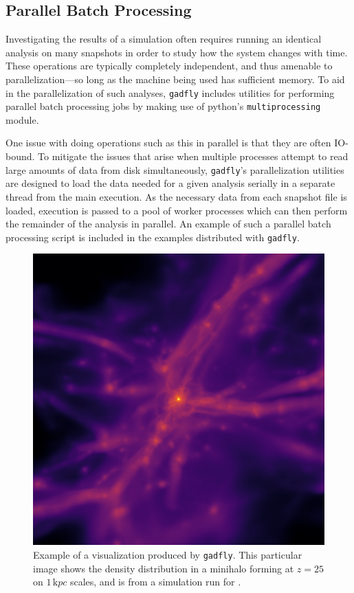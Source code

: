 \documentclass{thesis}
\newcommand{\code}[1]{\texttt{#1}}
\begin{document}
\subsection{Parallel Batch Processing}
\label{sec:parallel}
Investigating the results of a simulation often requires running an identical analysis on many snapshots in order to study how the system changes with time.  
These operations are typically completely independent, and thus amenable to parallelization---so long as the machine being used has sufficient memory.
To aid in the parallelization of such analyses, \code{gadfly} includes utilities for performing parallel batch processing jobs by making use of python's \code{multiprocessing} module. 

One issue with doing operations such as this in parallel is that they are often IO-bound.
To mitigate the issues that arise when multiple processes attempt to read large amounts of data from disk simultaneously, \code{gadfly}'s parallelization utilities are designed to load the data needed for a given analysis serially in a separate thread from the main execution. 
As the necessary data from each snapshot file is loaded, execution is passed to a pool of worker processes which can then perform the remainder of the analysis in parallel.  An example of such a parallel batch processing script is included in the examples distributed with \code{gadfly}.

\begin{figure}
\begin{center}
\includegraphics[width=\columnwidth]{figures/structure_halo/structure_halo}
\caption{\label{fig:vis}
Example of a visualization produced by \code{gadfly}.  This particular image shows the density distribution in a minihalo forming at $z=25$ on $1\,{\mathrm kpc}$ scales, and is from a simulation run for \citet{Hummeletal2015}.%
}
\end{center}
\end{figure}
\end{document}

